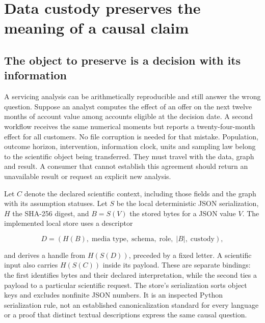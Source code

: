 \hypertarget{data-custody-preserves-the-meaning-of-a-causal-claim}{%
\section{Data custody preserves the meaning of a causal
claim}\label{data-custody-preserves-the-meaning-of-a-causal-claim}}

\label{exec14:artifact-custody}

\hypertarget{the-object-to-preserve-is-a-decision-with-its-information}{%
\subsection{The object to preserve is a decision with its
information}\label{the-object-to-preserve-is-a-decision-with-its-information}}

A servicing analysis can be arithmetically reproducible and still answer
the wrong question. Suppose an analyst computes the effect of an offer
on the next twelve months of account value among accounts eligible at
the decision date. A second workflow receives the same numerical moments
but reports a twenty-four-month effect for all customers. No file
corruption is needed for that mistake. Population, outcome horizon,
intervention, information clock, units and sampling law belong to the
scientific object being transferred. They must travel with the data,
graph and result. A consumer that cannot establish this agreement should
return an unavailable result or request an explicit new analysis.

Let \(C\) denote the declared scientific context, including those fields
and the graph with its assumption statuses. Let \(S\) be the local
deterministic JSON serialization, \(H\) the SHA-256 digest, and
\(B=S(V)\) the stored bytes for a JSON value \(V\). The implemented
local store uses a descriptor

\[
D=(H(B),\;\text{media type},\;\text{schema},\;\text{role},\;|B|,\;\text{custody}),
\]

and derives a handle from \(H(S(D))\), preceded by a fixed letter. A
scientific input also carries \(H(S(C))\) inside its payload. These are
separate bindings: the first identifies bytes and their declared
interpretation, while the second ties a payload to a particular
scientific request. The store's serialization sorts object keys and
excludes nonfinite JSON numbers. It is an inspected Python serialization
rule, not an established canonicalization standard for every language or
a proof that distinct textual descriptions express the same causal
question.\citep{exec14_custody_implementation}

